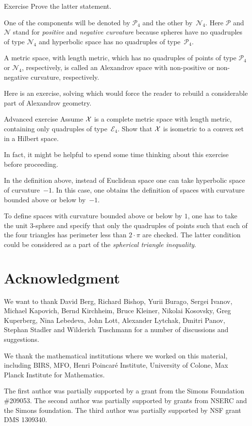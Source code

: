 \begin{thm}{Exercise}\label{ex:two-components-of-M4}
Prove the latter statement.
\end{thm}


One of the components will be denoted by $\mathcal{P}_4$ and the other by~$\mathcal{N}_4$.
Here $\mathcal{P}$ and $\mathcal{N}$ stand for {}\emph{positive} 
and {}\emph{negative curvature} because spheres have no quadruples of type $\mathcal{N}_4$ and 
hyperbolic space
has no quadruples of type~$\mathcal{P}_4$.

A metric space, with length metric, 
which has no quadruples of points of type $\mathcal{P}_4$ or $\mathcal{N}_4$, 
respectively,  
is called an Alexandrov space with non-positive or non-negative curvature, respectively.

Here is an exercise, solving which would force the reader to rebuild a considerable part of Alexandrov geometry.

\begin{thm}{Advanced exercise}\label{ex:convex-set}
Assume $\mathcal{X}$ is a complete metric space with length metric, 
containing only quadruples of type~$\mathcal{E}_4$.
Show that $\mathcal{X}$ is isometric to a convex set in a Hilbert space.
\end{thm}

In fact, it might be helpful to spend some time thinking about this exercise before proceeding.

In the definition above, 
instead of  Euclidean space 
one can take  
hyperbolic space of curvature~$-1$.
In this case,
one obtains the definition of spaces with curvature bounded above or below by~$-1$.

To define spaces with curvature bounded above or below by $1$,
one has to take the unit 3-sphere 
and specify that only the quadruples of points such that each of the four triangles has perimeter 
less than $2\cdot\pi$ are checked.
The latter condition could be considered as a part of the {}\emph{spherical triangle inequality}.


\section*{Acknowledgment}
We want to  thank 
David Berg,
Richard Bishop,
Yurii Burago,
Sergei Ivanov,
Michael Kapovich, 
Bernd Kirchheim, 
Bruce Kleiner,
Nikolai Kosovsky,
Greg Kuperberg,
Nina Lebedeva,
John Lott,
Alexander Lytchak,
Dmitri Panov,
Stephan Stadler
and 
Wilderich Tuschmann 
for a number of discussions and suggestions.


We thank the mathematical institutions where we worked on this material,  including
BIRS, 
MFO, 
Henri Poincar\'{e} Institute,
University of Colone, 
Max Planck Institute for Mathematics. 

The first author was partially supported by a grant from the Simons Foundation \#209053.
The second author was partially supported by grants from NSERC and the Simons foundation.
The third author was partially supported by NSF grant DMS 1309340.

